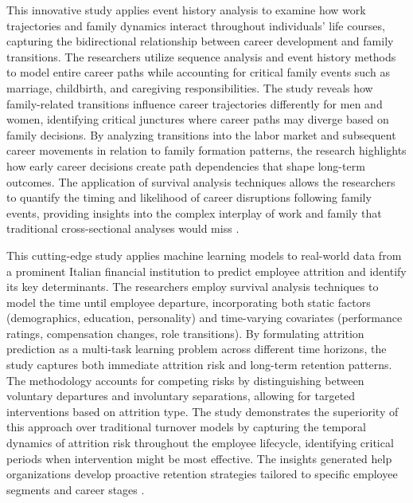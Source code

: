 \documentclass[../main.tex]{subfiles}
\begin{document}
This innovative study applies event history analysis to examine how work trajectories and family dynamics interact throughout individuals' life courses, capturing the bidirectional relationship between career development and family transitions. The researchers utilize sequence analysis and event history methods to model entire career paths while accounting for critical family events such as marriage, childbirth, and caregiving responsibilities. The study reveals how family-related transitions influence career trajectories differently for men and women, identifying critical junctures where career paths may diverge based on family decisions. By analyzing transitions into the labor market and subsequent career movements in relation to family formation patterns, the research highlights how early career decisions create path dependencies that shape long-term outcomes. The application of survival analysis techniques allows the researchers to quantify the timing and likelihood of career disruptions following family events, providing insights into the complex interplay of work and family that traditional cross-sectional analyses would miss \parencite{vidal2023dynamic}.

This cutting-edge study applies machine learning models to real-world data from a prominent Italian financial institution to predict employee attrition and identify its key determinants. The researchers employ survival analysis techniques to model the time until employee departure, incorporating both static factors (demographics, education, personality) and time-varying covariates (performance ratings, compensation changes, role transitions). By formulating attrition prediction as a multi-task learning problem across different time horizons, the study captures both immediate attrition risk and long-term retention patterns. The methodology accounts for competing risks by distinguishing between voluntary departures and involuntary separations, allowing for targeted interventions based on attrition type. The study demonstrates the superiority of this approach over traditional turnover models by capturing the temporal dynamics of attrition risk throughout the employee lifecycle, identifying critical periods when intervention might be most effective. The insights generated help organizations develop proactive retention strategies tailored to specific employee segments and career stages \parencite{attrition2025predicting}.
\end{document}
